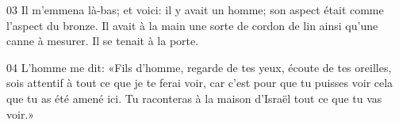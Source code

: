 
03 Il m’emmena là-bas; et voici: il y avait un homme; son aspect était comme l’aspect du bronze. Il avait à la main une sorte de cordon de lin ainsi qu’une canne à mesurer. Il se tenait à la porte.

04 L’homme me dit: «Fils d’homme, regarde de tes yeux, écoute de tes oreilles, sois attentif à tout ce que je te ferai voir, car c’est pour que tu puisses voir cela que tu as été amené ici. Tu raconteras à la maison d’Israël tout ce que tu vas voir.»
